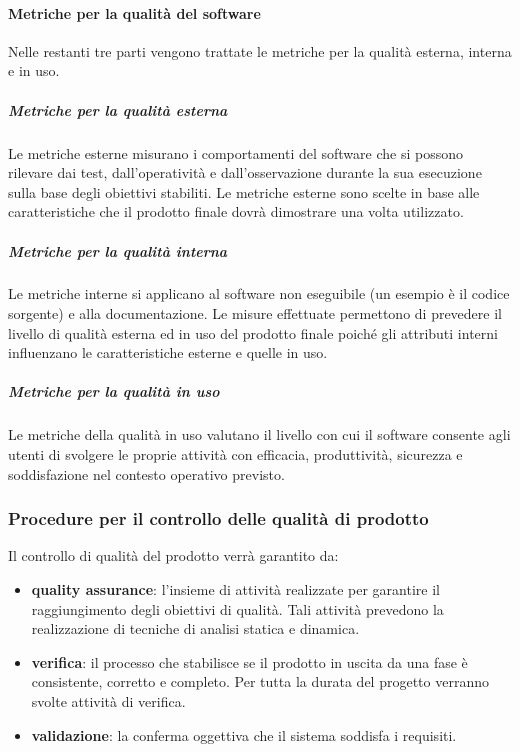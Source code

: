 			\paragraph{Metriche per la qualità del software}
			Nelle restanti tre parti vengono trattate le metriche per la qualità esterna, interna e in uso.
				\subparagraph{Metriche per la qualità esterna}
				Le metriche esterne misurano i comportamenti del software che si possono rilevare dai test, dall'operatività e dall'osservazione durante la sua esecuzione sulla base degli obiettivi stabiliti. Le metriche esterne sono scelte in base alle caratteristiche che il prodotto finale dovrà dimostrare una volta utilizzato.
				\subparagraph{Metriche per la qualità interna}
				Le metriche interne si applicano al software non eseguibile (un esempio è il codice sorgente) e alla documentazione. Le misure effettuate permettono di prevedere il livello di qualità esterna ed in uso del prodotto finale poiché gli attributi interni influenzano le caratteristiche esterne e quelle in uso.
				\subparagraph{Metriche per la qualità in uso}
				Le metriche della qualità in uso valutano il livello con cui il software consente agli utenti di svolgere le proprie attività con efficacia, produttività, sicurezza e soddisfazione nel contesto operativo previsto.
		\subsubsection{Procedure per il controllo delle qualità di prodotto}
		Il controllo di qualità del prodotto verrà garantito da:
		\begin{itemize}
			\item \textbf{quality assurance}: l'insieme di attività realizzate per garantire il raggiungimento degli obiettivi di qualità. Tali attività prevedono la realizzazione di tecniche di analisi statica e dinamica.
			\item \textbf{verifica}: il processo che stabilisce se il prodotto in uscita da una fase è consistente, corretto e completo. Per tutta la durata del progetto verranno svolte attività di verifica.
			\item \textbf{validazione}: la conferma oggettiva che il sistema soddisfa i requisiti.
		\end{itemize}
